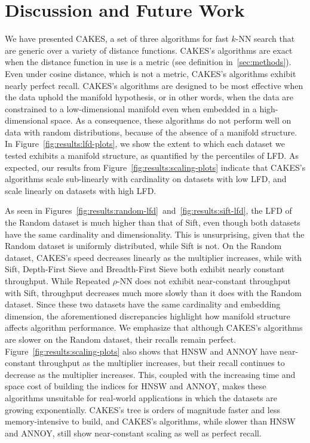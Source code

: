 \section{Discussion and Future Work}
\label{sec:discussion-and-future-work}

We have presented CAKES, a set of three algorithms for fast $k$-NN search that are generic over a variety of distance functions.
CAKES's algorithms are exact when the distance function in use is a metric (see definition in~\ref{sec:methods}).
Even under cosine distance, which is not a metric, CAKES's algorithms exhibit nearly perfect recall.
CAKES's algorithms are designed to be most effective when the data uphold the manifold hypothesis, or in other words, when the data are constrained to a low-dimensional manifold even when embedded in a high-dimensional space.
As a consequence, these algorithms do not perform well on data with random distributions, because of the absence of a manifold structure.
In Figure~\ref{fig:results:lfd-plots}, we show the extent to which each dataset we tested exhibits a manifold structure, as quantified by the percentiles of LFD.
As expected, our results from Figure~\ref{fig:results:scaling-plots} indicate that CAKES's algorithms scale sub-linearly with cardinality on datasets with low LFD, and scale linearly on datasets with high LFD.

As seen in Figures~\ref{fig:results:random-lfd}~and~\ref{fig:results:sift-lfd}, the LFD of the Random dataset is much higher than that of Sift, even though both datasets have the same cardinality and dimensionality.
This is unsurprising, given that the Random dataset is uniformly distributed, while Sift is not.
On the Random dataset, CAKES's speed decreases linearly as the multiplier increases, while with Sift, Depth-First Sieve and Breadth-First Sieve both exhibit nearly constant throughput.
While Repeated $\rho$-NN does not exhibit near-constant throughput with Sift, throughput decreases much more slowly than it does with the Random dataset.
Since these two datasets have the same cardinality and embedding dimension, the aforementioned discrepancies highlight how manifold structure affects algorithm performance.
We emphasize that although CAKES's algorithms are slower on the Random dataset, their recalls remain perfect.
Figure~\ref{fig:results:scaling-plots} also shows that HNSW and ANNOY have near-constant throughput as the multiplier increases, but their recall continues to decrease as the multiplier increases.
This, coupled with the increasing time and space cost of building the indices for HNSW and ANNOY, makes these algorithms unsuitable for real-world applications in which the datasets are growing exponentially.
CAKES's tree is orders of magnitude faster and less memory-intensive to build, and CAKES's algorithms, while slower than HNSW and ANNOY, still show near-constant scaling as well as perfect recall.

